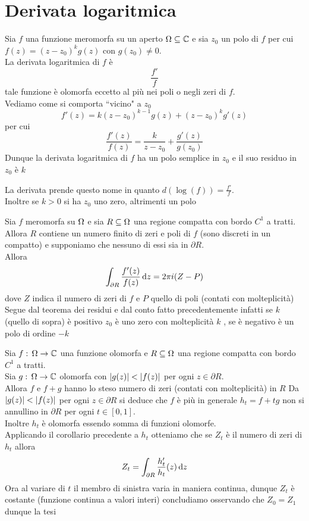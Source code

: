 \section{Derivata logaritmica}
Sia $f$ una funzione meromorfa su un aperto $\Omega \subseteq \mathbb{C}$ e sia $z_0$ un polo di $f$ per cui $f(z) = (z-z_0)^k g(z) $ con $g(z_0)\neq 0 $.\\
La derivata logaritmica di $f$  \`e $$\frac{f'}{f} $$
tale funzione \`e olomorfa eccetto al pi\`u nei poli o negli zeri di $f$.\\
Vediamo come si comporta ``vicino" a $z_0$
$$ f'(z) = k(z-z_0)^{k-1}g(z) + (z-z_0)^k g'(z)$$
per cui 
$$ \frac{f'(z)}{f(z)}=\frac{k}{z-z_0} +\frac{g'(z)}{g(z_0)}$$
Dunque la derivata logaritmica di $f$ ha un polo semplice in $z_0$ e il suo residuo in $z_0$ \`e $k$
\begin{oss}La derivata prende questo nome in quanto $d(\log(f))= \frac{f'}{f}$.\\
Inoltre se $k>0$ si ha $z_0$ uno zero, altrimenti un polo
\end{oss}
\begin{cor}Sia $f$ meromorfa su $\Omega$ e sia $R\subseteq \Omega$ una regione compatta con bordo $C^1$ a tratti.\\
Allora $R$ contiene un numero finito di zeri e poli di $f$ (sono discreti in un compatto) e supponiamo che nessuno di essi sia in $\partial R$.\\
Allora 
$$ \int_{\partial R} \frac{f'(z)}{f(z)}\, \mathrm{d}z =2\pi i (Z- P)$$
dove $Z$ indica il numero di zeri di $f$ e $P$ quello di poli (contati con molteplicit\`a)
\proof Segue dal teorema dei residui e dal conto fatto precedentemente  infatti se $k$ (quello di sopra) \`e positivo $z_0$ \`e uno zero con molteplicit\`a $k$ , se \`e negativo \`e un polo di ordine $-k$
\end{cor}
\begin{cor}\bianco
Sia $f:\, \Omega \to \mathbb{C}$ una funzione olomorfa e $R\subseteq \Omega$ una regione compatta con bordo $C^1$ a tratti.\\
Sia $g:\, \Omega \to \mathbb{C}$ olomorfa con $\left\vert g(z) \right\vert < \left\vert f(z) \right\vert$ per ogni $z\in \partial R$.\\
Allora $f$ e $f+g$ hanno lo steso numero di zeri (contati con molteplicit\`a) in $R$
\proof Da $\left\vert g(z) \right\vert <\left\vert f(z) \right\vert$ per ogni $z\in \partial R$ si deduce che $f$ \`e pi\`u in generale $h_t = f+tg$ non si annullino in $\partial R$  per ogni $t\in [0,1]$.\\
Inoltre $h_t$ \`e olomorfa essendo somma di funzioni olomorfe.\\
Applicando il corollario precedente a $h_t$ otteniamo che se $Z_t$ \`e il numero di zeri di $h_t$ allora 
$$ Z_t = \int_{\partial R} \frac{h_t'}{h_t}(z) \, \mathrm{d}z $$ 
Ora al variare di $t$ il membro di sinistra varia in maniera continua, dunque $Z_t$ \`e costante (funzione continua a valori interi) concludiamo osservando che $Z_0=Z_1$ dunque la tesi
\end{cor}
